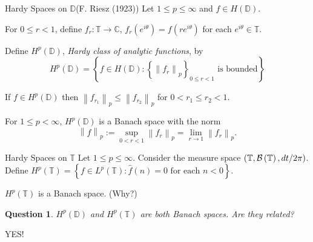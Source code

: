 \documentclass{beamer}
\newtheorem{question}[theorem]{Question}
\numberwithin{equation}{subsection}
\newcommand{\C}{\mathbb C}
\newcommand{\D}{\mathbb D}
\newcommand{\T}{\mathbb T}
\newcommand{\calB}{{\cal B}}
\newcommand{\norm}[1]{\left\lVert #1 \right\rVert}
\begin{document}
 \begin{frame}{Hardy Spaces on $\D$}{(F. Riesz (1923))}
     \pause
     Let $1\le p \le \infty$ and $f\in H \left( \D \right)$.

\pause 
For $0\le r < 1$, define $f_{r} : \T \to \C$, $f_{r} \left( e^{i\theta} \right) = f\left( re^{i\theta} \right)$ for each $e^{i\theta} \in \T$.
     \pause

     Define $H^{p} \left( \D \right)$, \textit{Hardy class of analytic functions}, by 
     \begin{equation*}
	 H^{p} \left( \D \right) = \left\{ f\in H\left( \D \right) : \left\{ \norm{f_{r}}_{p} \right\}_{0\le r < 1} \text{ is bounded} \right\} 
     \end{equation*}
\pause
\begin{theorem}[G.H. Hardy, 1915]
	 If $f\in H^{p} \left( \D \right)$ then
	     $\norm{f_{r_{1}}}_{p} \le \norm{f_{r_{2}}}_{p}$
	 for $0 < r_{1} \le r_{2} < 1$.
	 \label{thm:increasing-norm}
     \end{theorem}
\pause
     \begin{theorem}
	 For $1\le p < \infty$, $H^{p} \left( \D \right)$ is a Banach space with the norm
	 \begin{equation*}
	     \norm{f}_{p}:=\sup_{0< r < 1} \norm{f_r}_{p} = \lim_{r \to 1} \norm{f_{r}}_{p}.
	 \end{equation*}
	 \label{thm:HpD-Banach}
     \end{theorem}
 \end{frame}

 \begin{frame}{Hardy Spaces on $\T$}
     \pause
     Let $1 \le p \le \infty$. Consider the measure space $\left( \T, \calB\left( \T \right), dt/2\pi \right)$. 
     \pause
     Define
     $H^{p} \left( \T \right) = \left\{ f\in L^{p} \left( \T \right) : \hat{f}\left( n \right) = 0 \text{ for each } n<0 \right\}$.
     
     \pause
     $H^{p}\left( \T \right)$ is a Banach space. \pause (Why?)

     \pause
     \begin{question}
	 $H^{p} \left( \D \right)$ and $H^{p}\left( \T \right)$ are both Banach spaces. Are they related?
     \end{question}
     \pause
     \begin{center}
     YES!
 \end{center}
 \end{frame}
\end{document}
